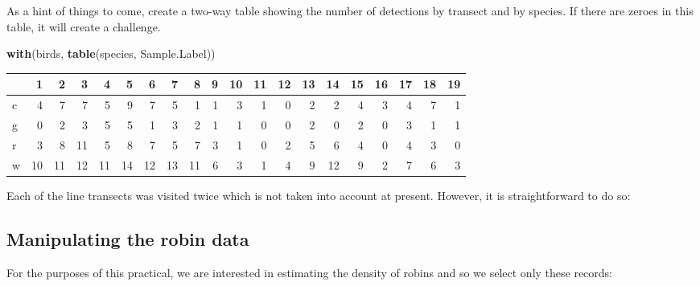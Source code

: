 \documentclass[10pt,a4paper]{tufte-handout}
\newenvironment{Shaded}{\begin{snugshade}}{\end{snugshade}}
\newcommand{\KeywordTok}[1]{\textcolor[rgb]{0.13,0.29,0.53}{\textbf{#1}}}
\newcommand{\NormalTok}[1]{#1}
\newcommand{\OperatorTok}[1]{\textcolor[rgb]{0.81,0.36,0.00}{\textbf{#1}}}
\newcommand{\StringTok}[1]{\textcolor[rgb]{0.31,0.60,0.02}{#1}}
\begin{document}
As a hint of things to come, create a two-way table showing the number
of detections by transect and by species. If there are zeroes in this
table, it will create a challenge.

\begin{Shaded}
\begin{Highlighting}[]
\KeywordTok{with}\NormalTok{(birds, }\KeywordTok{table}\NormalTok{(species, Sample.Label))}
\end{Highlighting}
\end{Shaded}

\begin{longtable}[]{@{}lrrrrrrrrrrrrrrrrrrr@{}}
\toprule
& 1 & 2 & 3 & 4 & 5 & 6 & 7 & 8 & 9 & 10 & 11 & 12 & 13 & 14 & 15 & 16 &
17 & 18 & 19\tabularnewline
\midrule
\endhead
c & 4 & 7 & 7 & 5 & 9 & 7 & 5 & 1 & 1 & 3 & 1 & 0 & 2 & 2 & 4 & 3 & 4 &
7 & 1\tabularnewline
g & 0 & 2 & 3 & 5 & 5 & 1 & 3 & 2 & 1 & 1 & 0 & 0 & 2 & 0 & 2 & 0 & 3 &
1 & 1\tabularnewline
r & 3 & 8 & 11 & 5 & 8 & 7 & 5 & 7 & 3 & 1 & 0 & 2 & 5 & 6 & 4 & 0 & 4 &
3 & 0\tabularnewline
w & 10 & 11 & 12 & 11 & 14 & 12 & 13 & 11 & 6 & 3 & 1 & 4 & 9 & 12 & 9 &
2 & 7 & 6 & 3\tabularnewline
\bottomrule
\end{longtable}

Each of the line transects was visited twice which is not taken into
account at present. However, it is straightforward to do so:

\begin{Shaded}
\end{Shaded}

\hypertarget{manipulating-the-robin-data}{%
\subsection{Manipulating the robin
data}\label{manipulating-the-robin-data}}

For the purposes of this practical, we are interested in estimating the
density of robins and so we select only these records:

\begin{Shaded}
\end{Shaded}
\end{document}
